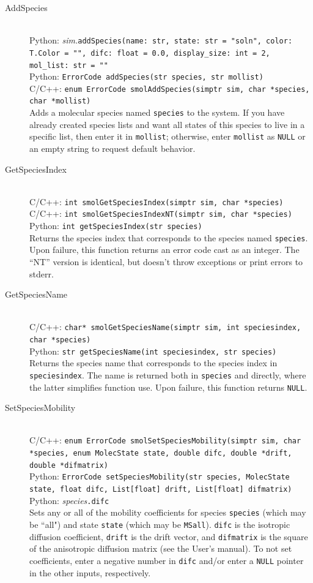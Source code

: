\documentclass {book}
\newcommand {\ttt} {\texttt}
\begin{document}
\begin{description}

\item[AddSpecies]
\hfill \\
Python: \textit{sim.}\ttt{addSpecies(name: str, state: str = "soln", color: T.Color = "", difc: float = 0.0, display\_size: int = 2, mol\_list: str = ""}\\
Python: \ttt{ErrorCode addSpecies(str species, str mollist)}\\
C/C++: \ttt{enum ErrorCode smolAddSpecies(simptr sim, char *species, char *mollist)}\\
Adds a molecular species named \ttt{species} to the system. If you have already created species lists and want all states of this species to live in a specific list, then enter it in \ttt{mollist}; otherwise, enter \ttt{mollist} as \ttt{NULL} or an empty string to request default behavior.

\item[GetSpeciesIndex]
\hfill \\
C/C++: \ttt{int smolGetSpeciesIndex(simptr sim, char *species)}\\
C/C++: \ttt{int smolGetSpeciesIndexNT(simptr sim, char *species)}\\
Python: \ttt{int getSpeciesIndex(str species)}\\
Returns the species index that corresponds to the species named \ttt{species}. Upon failure, this function returns an error code cast as an integer. The ``NT'' version is identical, but doesn't throw exceptions or print errors to stderr.

\item[GetSpeciesName]
\hfill \\
C/C++: \ttt{char* smolGetSpeciesName(simptr sim, int speciesindex, char *species)}\\
Python: \ttt{str getSpeciesName(int speciesindex, str species)}\\
Returns the species name that corresponds to the species index in \ttt{speciesindex}. The name is returned both in \ttt{species} and directly, where the latter simplifies function use. Upon failure, this function returns \ttt{NULL}.

\item[SetSpeciesMobility]
\hfill \\
C/C++: \ttt{enum ErrorCode smolSetSpeciesMobility(simptr sim, char *species, enum MolecState state, double difc, double *drift, double *difmatrix)}\\
Python: \ttt{ErrorCode setSpeciesMobility(str species, MolecState state, float difc, List[float] drift, List[float] difmatrix)}\\
Python: \textit{species}\ttt{.difc}\\
Sets any or all of the mobility coefficients for species \ttt{species} (which may be ``all") and state \ttt{state} (which may be \ttt{MSall}). \ttt{difc} is the isotropic diffusion coefficient, \ttt{drift} is the drift vector, and \ttt{difmatrix} is the square of the anisotropic diffusion matrix (see the User's manual). To not set coefficients, enter a negative number in \ttt{difc} and/or enter a \ttt{NULL} pointer in the other inputs, respectively.


\end{description}
\end{document}
